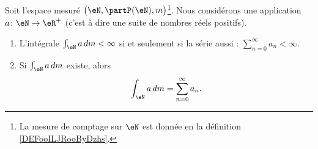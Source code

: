 \begin{proposition}     \label{PROPooPNQAooDRLcCm}
    Soit l'espace mesuré \( \big( \eN,\partP(\eN), m \big)\)\footnote{La mesure de comptage sur \( \eN\) est donnée en la définition \ref{DEFooILJRooByDzhs}.}. Nous considérons une application \( a\colon \eN\to \eR^+\) (c'est à dire une suite de nombres réels positifs).

	\begin{enumerate}
		\item
            L'intégrale \( \int_{\eN}a\,dm<\infty\)  si et seulement si la série aussi : \( \sum_{n=0}^{\infty}a_n<\infty\).
		\item
		      Si \( \int_{\eN}a\,dm\) existe, alors
              \begin{equation}      \label{EQooFIRMooKOEsAn}
			      \int_{\eN}a\,dm=\sum_{n=0}^{\infty}a_n.
		      \end{equation}
	\end{enumerate}
\end{proposition}


